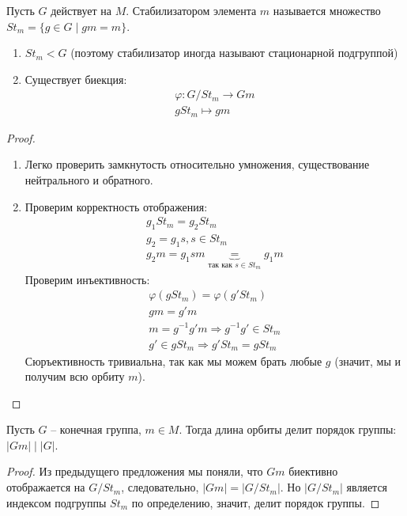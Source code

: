\begin{conj}
    Пусть $G$ действует на $M$. 
    Стабилизатором элемента $m$ называется множество $St_m = \{ g \in G \; | \; gm = m \}$.
\end{conj}

\begin{theorem-non} \quad 

    \begin{enumerate}
        \item $St_m < G$ (поэтому стабилизатор иногда называют стационарной подгруппой) 
        \item Существует биекция: 
        \begin{gather*}
            \varphi: G / St_m \to Gm \\
            gSt_m \mapsto gm
        \end{gather*}
    \end{enumerate}
\end{theorem-non}
\begin{proof} \quad \\
    \begin{enumerate}
        \item Легко проверить замкнутость относительно умножения, существование нейтрального и обратного.
        \item Проверим корректность отображения:
        \begin{gather*}
            g_1St_m = g_2St_m \\
            g_2 = g_1s, s \in St_m \\
            g_2m = g_1sm \underbrace{=}_{\text{так как } s \in St_m} g_1m
        \end{gather*}
        Проверим инъективность:
        \begin{gather*}
            \varphi(gSt_m) = \varphi(g'St_m) \\
            gm = g'm \\
            m = g^{-1}g'm \Rightarrow g^{-1}g' \in St_m \\
            g'\in gSt_m \Rightarrow g'St_m = gSt_m
        \end{gather*}
        Сюръективность тривиальна, так как мы можем брать любые $g$ (значит, мы и получим всю орбиту $m$).
    \end{enumerate}
\end{proof}

\begin{follow}
    Пусть $G$ -- конечная группа, $m \in M$.
    Тогда длина орбиты делит порядок группы: $|Gm| \mid |G|$.
\end{follow}
\begin{proof}
    Из предыдущего предложения мы поняли, что $Gm$ биективно отображается на $G / St_m$, следовательно, $|Gm| = |G / St_m|$.
    Но $|G / St_m|$ является индексом подгруппы $St_m$ по определению, значит, делит порядок группы.
\end{proof}

